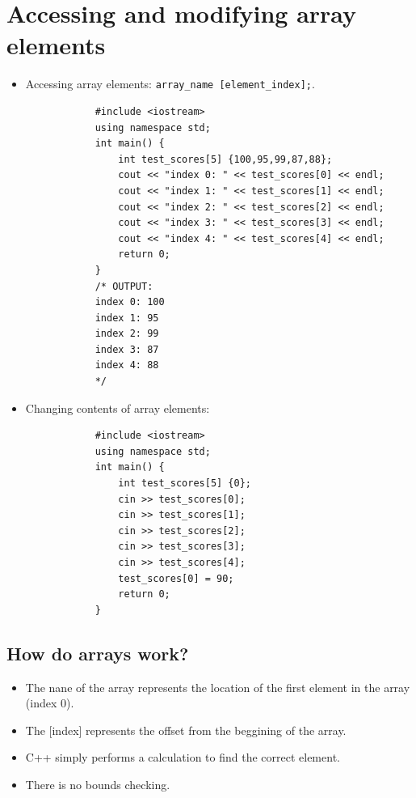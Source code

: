 \section{Accessing and modifying array elements}
\begin{itemize}
    \item Accessing array elements: \verb|array_name [element_index];|.
        \begin{verbatim}
            #include <iostream>
            using namespace std;
            int main() {
                int test_scores[5] {100,95,99,87,88};
                cout << "index 0: " << test_scores[0] << endl;
                cout << "index 1: " << test_scores[1] << endl;
                cout << "index 2: " << test_scores[2] << endl;
                cout << "index 3: " << test_scores[3] << endl;
                cout << "index 4: " << test_scores[4] << endl;
                return 0;
            } 
            /* OUTPUT: 
            index 0: 100
            index 1: 95
            index 2: 99
            index 3: 87
            index 4: 88
            */
        \end{verbatim}
    
    \item Changing contents of array elements: 
        \begin{verbatim}
            #include <iostream>
            using namespace std;
            int main() {
                int test_scores[5] {0};
                cin >> test_scores[0];
                cin >> test_scores[1];
                cin >> test_scores[2];
                cin >> test_scores[3];
                cin >> test_scores[4];
                test_scores[0] = 90;
                return 0;
            } 
        \end{verbatim}
\end{itemize}

\subsection{How do arrays work?}
\begin{itemize}
    \item The nane of the array represents the location of the first element in the array (index 0).
    \item The [index] represents the offset from the beggining of the array.
    \item C++ simply performs a calculation to find the correct element.
    \item There is no bounds checking.
\end{itemize}

